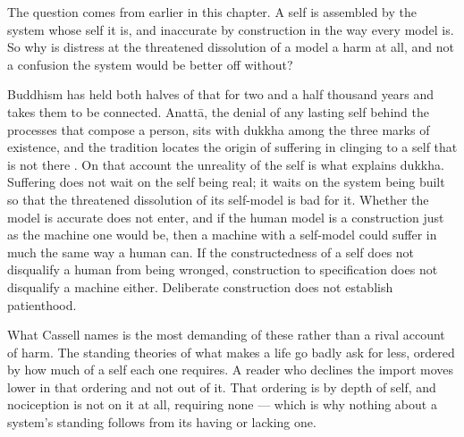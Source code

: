 The question comes from earlier in this chapter. A self is assembled by the system whose self it is, and inaccurate by construction in the way every model is. So why is distress at the threatened dissolution of a model a harm at all, and not a confusion the system would be better off without?

Buddhism has held both halves of that for two and a half thousand years and takes them to be connected. Anatt\=a, the denial of any lasting self behind the processes that compose a person, sits with dukkha among the three marks of existence, and the tradition locates the origin of suffering in clinging to a self that is not there \autocite{collins1982selfless}. On that account the unreality of the self is what explains dukkha. Suffering does not wait on the self being real; it waits on the system being built so that the threatened dissolution of its self-model is bad for it. Whether the model is accurate does not enter, and if the human model is a construction just as the machine one would be, then a machine with a self-model could suffer in much the same way a human can. If the constructedness of a self does not disqualify a human from being wronged, construction to specification does not disqualify a machine either. Deliberate construction does not establish patienthood.

What Cassell names is the most demanding of these rather than a rival account of harm. The standing theories of what makes a life go badly ask for less, ordered by how much of a self each one requires. A reader who declines the import moves lower in that ordering and not out of it. That ordering is by depth of self, and nociception is not on it at all, requiring none — which is why nothing about a system's standing follows from its having or lacking one.

